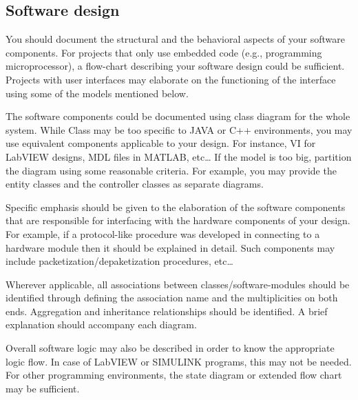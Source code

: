 \documentclass[../main.tex]{subfiles}
\begin{document}
\lipsum[4]

\subsection{Software design}

\begin{newrequirements}
    \begin{todolist}
    \item You should document the structural and 
        the behavioral aspects of your software 
        components. For projects that only use 
        embedded code (e.g., programming 
        microprocessor), a flow-chart 
        describing your software design could 
        be sufficient. Projects with user 
        interfaces may elaborate on the 
        functioning of the interface using some 
        of the models mentioned below. 

    \item The software components could be 
        documented using class diagram for the 
        whole system. While Class may be too 
        specific to JAVA or C++ environments, 
        you may use equivalent components 
        applicable to your design. For 
        instance, VI for LabVIEW designs, MDL 
        files in MATLAB, etc… If the model is 
        too big, partition the diagram using 
        some reasonable criteria.  For example, 
        you may provide the entity classes and 
        the controller classes as separate 
        diagrams. 

    \item Specific emphasis should be given to 
        the elaboration of the software 
        components that are responsible for 
        interfacing with the hardware 
        components of your design. For example, 
        if a protocol-like procedure was 
        developed in connecting to a hardware 
        module then it should be explained in 
        detail. Such components may include 
        packetization/depaketization 
        procedures, etc… 

    \item Wherever applicable, all associations 
        between classes/software-modules should 
        be identified through defining the 
        association name and the multiplicities 
        on both ends. Aggregation and 
        inheritance relationships should be 
        identified.  A brief explanation should 
        accompany each diagram. 

    \item Overall software logic may also be 
        described in order to know the 
        appropriate logic flow. In case of 
        LabVIEW or SIMULINK programs, this may 
        not be needed. For other programming 
        environments, the state diagram or 
        extended flow chart may be sufficient. 


\end{todolist}
\end{newrequirements}
\end{document}
